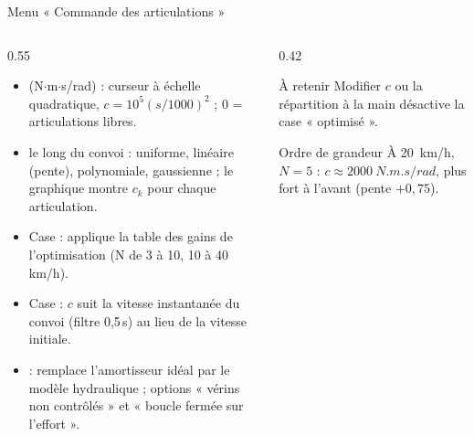 \documentclass[aspectratio=169,9pt]{beamer}
\begin{document}
\begin{frame}{Menu « Commande des articulations »}
  \begin{columns}[T]
  \begin{column}{0.55\textwidth}
    \begin{itemize}
      \item {} (N$\cdot$m$\cdot$s/rad) : curseur à échelle quadratique, $c=10^5(s/1000)^2$ ; 0 = articulations libres.
      \item {} le long du convoi : uniforme, linéaire (pente), polynomiale, gaussienne ; le graphique montre $c_k$ pour chaque articulation.
      \item Case  : applique la table des gains de l'optimisation (N de 3 à 10, 10 à 40 km/h).
      \item Case  : $c$ suit la vitesse instantanée du convoi (filtre 0,5\,s) au lieu de la vitesse initiale.
      \item {} : remplace l'amortisseur idéal par le modèle hydraulique ; options « vérins non contrôlés » et « boucle fermée sur l'effort ».
    \end{itemize}
  \end{column}
  \begin{column}{0.42\textwidth}
    \begin{alertblock}{À retenir}
      Modifier $c$ ou la répartition à la main désactive la case « optimisé ».
    \end{alertblock}
    \begin{block}{Ordre de grandeur}
      À \SI{20}{km/h}, $N=5$ : $c\approx\SI{2000}{N.m.s/rad}$, plus fort à l'avant (pente $+0{,}75$).
    \end{block}
  \end{column}
  \end{columns}
\end{frame}
\end{document}
